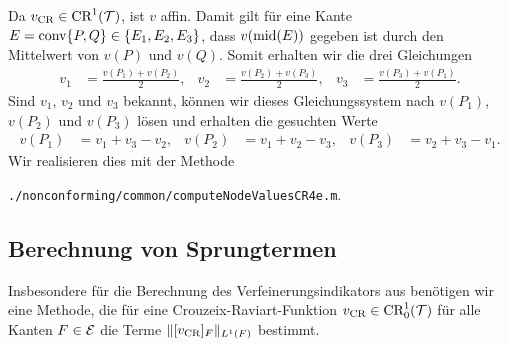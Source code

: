 Da $v_\textup{CR}\in\textup{CR}^1(\mathcal{T})$, ist $v$ affin. Damit gilt für eine Kante
$E=\textup{conv}\{P,Q\}\in\{E_1,E_2,E_3\}$, dass $v(\textup{mid}(E))$ gegeben ist durch den
Mittelwert von $v(P)$ und $v(Q)$.
Somit erhalten wir die drei Gleichungen
\begin{align*}
  v_1 &= \frac{v(P_1)+v(P_2)}{2},  
  &v_2 &= \frac{v(P_2)+v(P_3)}{2},  
  &v_3 &= \frac{v(P_3)+v(P_1)}{2}.
\end{align*}
Sind $v_1$, $v_2$ und $v_3$ bekannt, können wir dieses Gleichungssystem nach 
$v(P_1)$, $v(P_2)$ und $v(P_3)$ lösen und erhalten die gesuchten Werte
\begin{align*}
 v(P_1)&=v_1+v_3-v_2, &v(P_2)&= v_1+v_2-v_3,&v(P_3)&=v_2+v_3-v_1.
\end{align*}
Wir realisieren dies mit der Methode
\begin{center}
  \texttt{./nonconforming/common/computeNodeValuesCR4e.m}.
\end{center} 

\subsection{Berechnung von Sprungtermen}
\label{sec:jumptTermsImplementation}

Insbesondere für die Berechnung des Verfeinerungsindikators aus
 benötigen wir eine Methode, die
für eine Crouzeix-Raviart-Funktion
$v_\textup{CR}\in\textup{CR}^1_0(\mathcal{T})$
für alle Kanten $F\in\mathcal{E}$ die Terme $\Vert [v_\textup{CR}]_F\Vert_{L^1(F)}$ 
bestimmt.

